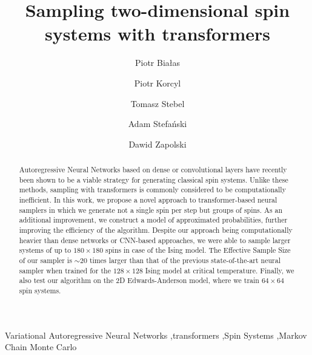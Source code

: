 \documentclass[3p, times,merge]{elsarticle}
\begin{document}
\begin{frontmatter}

\title{Sampling two-dimensional spin systems with transformers}
\author[iis]{Piotr Białas}
\author[ift]{Piotr Korcyl}
\author[ift]{Tomasz Stebel}
\author[ift]{Adam Stefański}
\author[iis,ds]{Dawid Zapolski}



\address[iis]{Institute of Applied Computer Science, Jagiellonian University, ul.~Łojasiewicza 11, 30-348 Kraków, Poland}

\address[ift]{Institute of Theoretical Physics, Jagiellonian University, ul.~Łojasiewicza 11, 30-348 Kraków, Poland}


\address[ds]{Doctoral School of Exact and Natural Sciences, Jagiellonian University, ul.~Łojasiewicza 11, 30-348 Kraków, Poland}





\begin{abstract}
Autoregressive Neural Networks based on dense or convolutional layers have recently been shown to be a viable strategy for generating classical spin systems.
Unlike these methods, sampling with transformers is commonly considered to be computationally inefficient.
In this work, we propose a novel approach to transformer-based neural samplers in which we generate not a single spin per step but groups of spins. As an additional improvement, we construct a model of approximated probabilities, further improving the efficiency of the algorithm. Despite our approach being computationally heavier than dense networks or CNN-based approaches, we were able to sample larger systems of up to $180 \times 180$ spins in case of the Ising model. The Effective Sample Size of our sampler is $\sim 20$ times larger than that of the previous state-of-the-art neural sampler when trained for the $128 \times 128$ Ising model at critical temperature. Finally, we also test our algorithm on the 2D Edwards-Anderson model, where we train $64\times 64$ spin systems.
\end{abstract}

\begin{keyword}
Variational Autoregressive Neural Networks \sep transformers \sep Spin Systems \sep Markov Chain Monte Carlo
\end{keyword}

\end{frontmatter}
\end{document}
